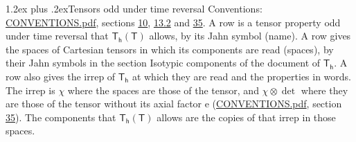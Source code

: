 \documentclass[10pt,a4paper]{article}
\makeatletter
\renewcommand\section{\@startsection{section}{1}{\z@}{-3ex plus -1ex minus -.2ex}%
  {1.2ex plus .2ex}{\normalfont\large\sffamily\bfseries\color{parttitle}}}
\numberwithin{equation}{section}
\newcommand{\grp}[1]{\mathsf{#1}}
\newcommand{\irrprod}{\otimes}
\makeatother
\begin{document}
\section{Tensors odd under time reversal}\label{s:time_odd}
Conventions: \href{../../CONVENTIONS.pdf}{CONVENTIONS.pdf}, sections \href{../../../rotation/CONVENTIONS.pdf\#conv.10}{10}, \href{../../../rotation/CONVENTIONS.pdf\#conv.13.2}{13.2} and \href{../../CONVENTIONS.pdf\#conv.35}{35}.
\leavevmode\label{n:head.name.property}A row is a tensor property odd under time reversal that $\grp{T_{h}}(\grp{T})$ allows, by its Jahn symbol (name). \label{n:head.spaces}A row gives the spaces of Cartesian tensors in which its components are read (spaces), by their Jahn symbols in the section Isotypic components of the document of \href{../../../rotation/data/pdf/Th.pdf}{$\grp{T_{h}}$}. \label{n:head.properties}A row also gives the irrep of $\grp{T_{h}}$ at which they are read and the properties in words. The irrep is $\chi$ where the spaces are those of the tensor, and $\chi \irrprod \det$ where they are those of the tensor without its axial factor e (\href{../../CONVENTIONS.pdf}{CONVENTIONS.pdf}, section \href{../../CONVENTIONS.pdf\#conv.35}{35}). The components that $\grp{T_{h}}(\grp{T})$ allows are the copies of that irrep in those spaces.
\end{document}
